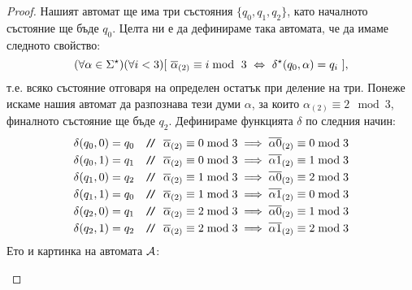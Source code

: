 \begin{proof}
  Нашият автомат ще има три състояния $\{q_0,q_1,q_2\}$, като началното състояние ще бъде $q_0$.
  Целта ни е да дефинираме така автомата, че да имаме следното свойство:
  \begin{equation}
    (\forall\alpha\in\Sigma^\star)(\forall i < 3)[\ \bin{\alpha} \equiv i \bmod\ 3\ \Leftrightarrow\ \delta^\star(q_0,\alpha) = q_i\ ],
  \end{equation}
  т.е. всяко състояние отговаря на определен остатък при деление на три.
  Понеже искаме нашия автомат да разпознава тези думи $\alpha$,
  за които $\alpha_{(2)} \equiv 2\mod 3$, финалното състояние ще бъде $q_2$.
  Дефинираме функцията $\delta$ по следния начин:
  \begin{align*}
    & \delta(q_0,0) = q_0 & \texttt{/}\!\texttt{/}\ {\ \overline{\alpha}_{(2)} \equiv 0 \bmod 3 \implies \overline{\alpha 0}_{(2)} \equiv 0 \bmod 3 }\\
    & \delta(q_0,1) = q_1 & \texttt{/}\!\texttt{/}\ {\ \overline{\alpha}_{(2)} \equiv 0 \bmod 3 \implies \overline{\alpha 1}_{(2)} \equiv 1 \bmod 3 }\\
    & \delta(q_1,0) = q_2 & \texttt{/}\!\texttt{/}\ {\ \overline{\alpha}_{(2)} \equiv 1 \bmod 3 \implies \overline{\alpha 0}_{(2)} \equiv 2 \bmod 3 }\\
    & \delta(q_1,1) = q_0 & \texttt{/}\!\texttt{/}\ {\ \overline{\alpha}_{(2)} \equiv 1 \bmod 3 \implies \overline{\alpha 1}_{(2)} \equiv 0 \bmod 3 }\\
    & \delta(q_2,0) = q_1 & \texttt{/}\!\texttt{/}\ {\ \overline{\alpha}_{(2)} \equiv 2 \bmod 3 \implies \overline{\alpha 0}_{(2)} \equiv 1 \bmod 3 }\\
    & \delta(q_2,1) = q_2 & \texttt{/}\!\texttt{/}\ {\ \overline{\alpha}_{(2)} \equiv 2 \bmod 3 \implies \overline{\alpha 1}_{(2)} \equiv 2 \bmod 3 }
  \end{align*}
  Ето и картинка на автомата $\mathcal{A}$:
  \begin{framed}
  \begin{figure}[H]
    \begin{center}
\end{center}
\end{figure}
\end{framed}
\end{proof}
